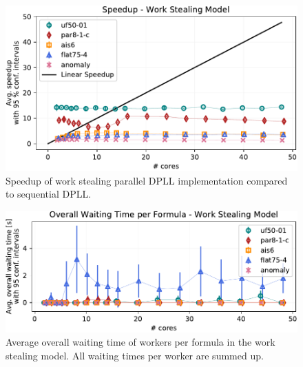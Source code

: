 \documentclass[letterpaper]{article}
\begin{document}
\begin{figure}[p]
    \centering
    \includegraphics[width=\columnwidth]{figures/scaling_stealing_subset_dpll_scaling_tar.pdf}
    \caption{Speedup of work stealing parallel DPLL implementation compared to sequential DPLL.
    \label{fig:dpll_stealing_speedup}}
\end{figure}
\begin{figure}[p]
	\centering
	\includegraphics[width=\columnwidth]{figures/waiting_stealing_subset_dpll_scaling_tar.pdf}
	\caption{Average overall waiting time of workers per formula in the work stealing model.
		All waiting times per worker are summed up.}
	\label{fig:dpll_stealing_waiting}
\end{figure}
\end{document}
